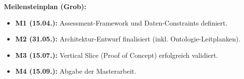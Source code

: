 \documentclass[11pt, a4paper]{article}
\begin{document}
\vspace{1cm}
\textbf{Meilensteinplan (Grob):}
\begin{itemize}
    \item \textbf{M1 (15.04.):} Assessment-Framework und Daten-Constraints definiert.
    \item \textbf{M2 (31.05.):} Architektur-Entwurf finalisiert (inkl. Ontologie-Leitplanken).
    \item \textbf{M3 (15.07.):} Vertical Slice (Proof of Concept) erfolgreich validiert.
    \item \textbf{M4 (15.09.):} Abgabe der Masterarbeit.
\end{itemize}
\end{document}
